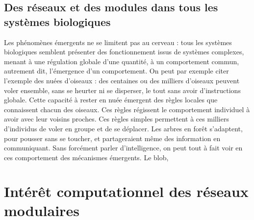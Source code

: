  
%
%
%
%

\subsection{Des réseaux et des modules dans tous les systèmes biologiques}

Les phénomènes émergents ne se limitent pas au cerveau : tous les systèmes biologiques semblent présenter des fonctionnement issus de systèmes complexes, menant à une régulation globale d'une quantité, à un comportement commun, autrement dit, l'émergence d'un comportement. On peut par exemple citer l'exemple des nuées d'oiseaux : des centaines ou des milliers d'oiseaux peuvent voler ensemble, sans se heurter ni se disperser, le tout sans avoir d'instructions globale. Cette capacité à rester en nuée émergent des règles locales que connaissent chacun des oiseaux. Ces règles régissent le comportement individuel à avoir avec leur voisins proches. Ces règles simples permettent à ces milliers d'individus de voler en groupe et de se déplacer.
Les arbres en forêt s'adaptent, pour pousser sans se toucher, et partageraient même des information en communiquant. Sans forcément parler d'intelligence, on peut tout à fait voir en ces comportement des mécanismes émergents. Le blob, 


\section{Intérêt computationnel des réseaux modulaires}

